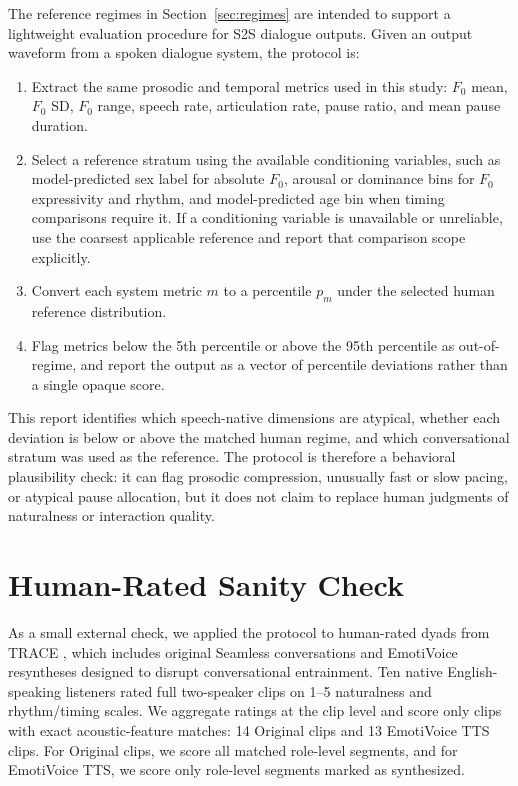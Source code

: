 \documentclass[conference]{IEEEtran}
\begin{document}
The reference regimes in Section~\ref{sec:regimes} are intended to support a lightweight evaluation procedure for S2S dialogue outputs. 
Given an output waveform from a spoken dialogue system, the protocol is:
\begin{enumerate}
    \item Extract the same prosodic and temporal metrics used in this study: $F_0$ mean, $F_0$ SD, $F_0$ range, speech rate, articulation rate, pause ratio, and mean pause duration.
    \item Select a reference stratum using the available conditioning variables, such as model-predicted sex label for absolute $F_0$, arousal or dominance bins for $F_0$ expressivity and rhythm, and model-predicted age bin when timing comparisons require it. If a conditioning variable is unavailable or unreliable, use the coarsest applicable reference and report that comparison scope explicitly.
    \item Convert each system metric $m$ to a percentile $p_m$ under the selected human reference distribution.
    \item Flag metrics below the 5th percentile or above the 95th percentile as out-of-regime, and report the output as a vector of percentile deviations rather than a single opaque score.
\end{enumerate}
This report identifies which speech-native dimensions are atypical, whether each deviation is below or above the matched human regime, and which conversational stratum was used as the reference. 
The protocol is therefore a behavioral plausibility check: it can flag prosodic compression, unusually fast or slow pacing, or atypical pause allocation, but it does not claim to replace human judgments of naturalness or interaction quality.


\section{Human-Rated Sanity Check}\label{sec:human_eval_check}

As a small external check, we applied the protocol to human-rated dyads from TRACE \cite{TRACE}, which includes original Seamless conversations and EmotiVoice resyntheses designed to disrupt conversational entrainment. 
Ten native English-speaking listeners rated full two-speaker clips on 1--5 naturalness and rhythm/timing scales. 
We aggregate ratings at the clip level and score only clips with exact acoustic-feature matches: 14 Original clips and 13 EmotiVoice TTS clips.
For Original clips, we score all matched role-level segments, and for EmotiVoice TTS, we score only role-level segments marked as synthesized.
\end{document}
